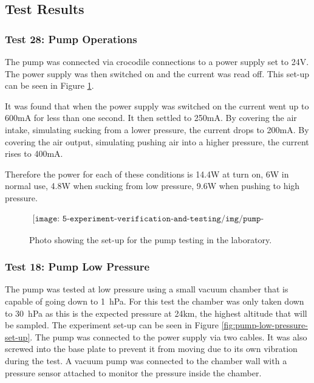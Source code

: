 \pagebreak

\subsection{Test Results}

\subsubsection{Test 28: Pump Operations}

The pump was connected via crocodile connections to a power supply set to 24V. The power supply was then switched on and the current was read off. This set-up can be seen in Figure \ref{fig:pump-testing}.

It was found that when the power supply was switched on the current went up to 600mA for less than one second. It then settled to 250mA. By covering the air intake, simulating sucking from a lower pressure, the current drops to 200mA. By covering the air output, simulating pushing air into a higher pressure, the current rises to 400mA.

Therefore the power for each of these conditions is 14.4W at turn on, 6W in normal use, 4.8W when sucking from low pressure, 9.6W when pushing to high pressure.


\begin{figure}[H]
    \begin{align*}
        \texttt{[image: 5-experiment-verification-and-testing/img/pump-testing.png]}
    \end{align*}
    \caption{Photo showing the set-up for the pump testing in the laboratory.} \label{fig:pump-testing}
\end{figure}

\subsubsection{Test 18: Pump Low Pressure}

The pump was tested at low pressure using a small vacuum chamber that is capable of going down to \SI{1}{\hecto\pascal}. For this test the chamber was only taken down to \SI{30}{\hecto\pascal} as this is the expected pressure at 24km, the highest altitude that will be sampled. The experiment set-up can be seen in Figure \ref{fig:pump-low-pressure-set-up}. The pump was connected to the power supply via two cables. It was also screwed into the base plate to prevent it from moving due to its own vibration during the test. A vacuum pump was connected to the chamber wall with a pressure sensor attached to monitor the pressure inside the chamber. 

